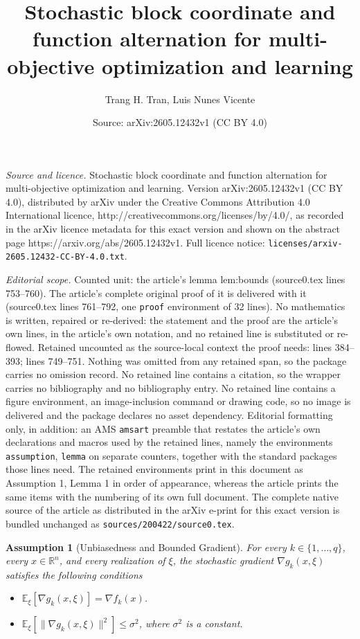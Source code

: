 \documentclass[10pt,a4paper]{amsart}
\title{Stochastic block coordinate and function alternation for multi-objective optimization and learning}
\author{Trang H. Tran, Luis Nunes Vicente}
\date{Source: arXiv:2605.12432v1 (CC BY 4.0)}
\newtheorem{assumption}{Assumption}
\begin{document}
\maketitle

\noindent\emph{Source and licence.} Stochastic block coordinate and function alternation for multi-objective optimization and learning. Version arXiv:2605.12432v1 (CC BY 4.0), distributed by arXiv under the Creative Commons Attribution 4.0 International licence, http://creativecommons.org/licenses/by/4.0/, as recorded in the arXiv licence metadata for this exact version and shown on the abstract page https://arxiv.org/abs/2605.12432v1. Full licence notice: \texttt{licenses/arxiv-2605.12432-CC-BY-4.0.txt}.\par\smallskip

\noindent\textit{Editorial scope.} Counted unit: the article's lemma lem:bounds (source0.tex lines 753--760). The article's complete original proof of it is delivered with it (source0.tex lines 761--792, one \texttt{proof} environment of 32 lines). No mathematics is written, repaired or re-derived: the statement and the proof are the article's own lines, in the article's own notation, and no retained line is substituted or re-flowed.  Retained uncounted as the source-local context the proof needs: lines 384--393; lines 749--751.  Nothing was omitted from any retained span, so the package carries no omission record.  No retained line contains a citation, so the wrapper carries no bibliography and no bibliography entry.  No retained line contains a figure environment, an image-inclusion command or drawing code, so no image is delivered and the package declares no asset dependency.  Editorial formatting only, in addition: an AMS \texttt{amsart} preamble that restates the article's own declarations and macros used by the retained lines, namely the environments \texttt{assumption}, \texttt{lemma} on separate counters, together with the standard packages those lines need.  The retained environments print in this document as Assumption 1, Lemma 1 in order of appearance, whereas the article prints the same items with the numbering of its own full document.  The complete native source of the article as distributed in the arXiv e-print for this exact version is bundled unchanged as \texttt{sources/200422/source0.tex}.
\begin{assumption}[Unbiasedness and Bounded Gradient]\label{assump:conds}
For every $k \in \{ 1, \dots, q\}$, every $x \in \mathbb{R}^n$,
and every realization of $\xi$, the stochastic gradient $\nabla g_k(x,\xi)$ satisfies the following conditions
\begin{itemize}
\item[(a)] %
$\mathbb{E}_{\xi} \left[\nabla g_k(x,\xi)\right] = \nabla f_k(x)$.
\item[(b)] %
$\mathbb{E}_{\xi}[\|\nabla g_k(x,\xi)\|^2] \leq \sigma^2$, where $\sigma^2$ is a constant. 
\end{itemize} 
\end{assumption}
\end{document}
